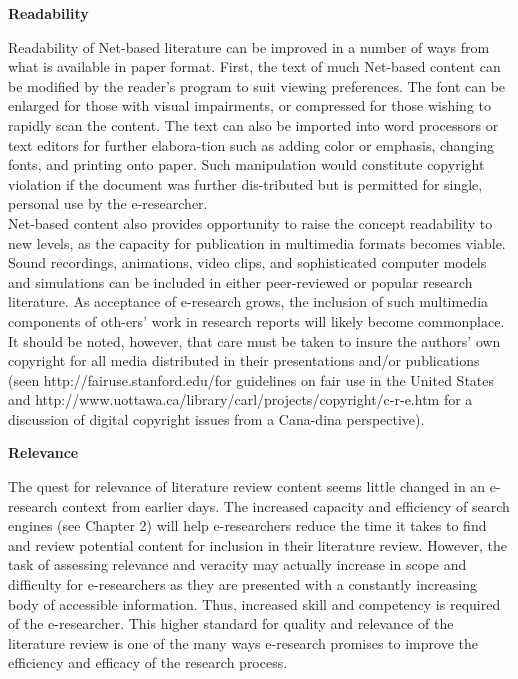 \documentclass{book}
\begin{document}
\vspace*{0.5cm}

\large{
\textbf{Readability}
}

\hspace*{0.7cm} Readability of Net-based literature can be improved in a number of ways from what is available in paper format. First, the text of much Net-based content can be modified by the reader's program to suit viewing preferences. The font can be enlarged for those with visual impairments, or compressed for those wishing to rapidly scan the content. The text can also be imported into word processors or text editors for further elabora-tion such as adding color or emphasis, changing fonts, and printing onto paper. Such manipulation would constitute copyright violation if the document was further dis-tributed but is permitted for single, personal use by the e-researcher.\\

\hspace*{0.7cm} Net-based content also provides opportunity to raise the concept readability to new levels, as the capacity for publication in multimedia formats becomes viable. Sound recordings, animations, video clips, and sophisticated computer models and simulations can be included in either peer-reviewed or popular research literature. As acceptance of e-research grows, the inclusion of such multimedia components of oth-ers' work in research reports will likely become commonplace. It should be noted, however, that care must be taken to insure the authors' own copyright for all media distributed in their presentations and/or publications (seen http://fairuse.stanford.edu/for guidelines on fair use in the United States and http://www.uottawa.ca/library/carl/projects/copyright/c-r-e.htm for a discussion of digital copyright issues from a Cana-dina perspective).\\

\vspace*{0.5cm}

\large{
\textbf{Relevance}\\
}

\hspace*{0.7cm} The quest for relevance of literature review content seems little changed in an e-research context from earlier days. The increased capacity and efficiency of search engines (see Chapter 2) will help e-researchers reduce the time it takes to find and review potential content for inclusion in their literature review. However, the task of assessing relevance and veracity may actually increase in scope and difficulty for e-researchers as they are presented with a constantly increasing body of accessible information. Thus, increased skill and competency is required of the e-researcher. This higher standard for quality and relevance of the literature review is one of the many ways e-research promises to improve the efficiency and efficacy of the research process.\\
\end{document}
